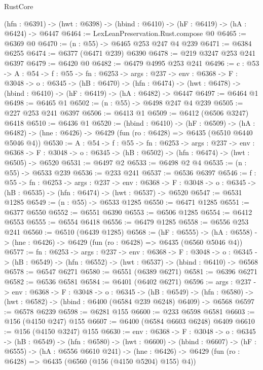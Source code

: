 \begin{lexlean}{RustCore}
\begin{coremodule}
  (hfn : @6391) -> (hwt : @6398) -> (hbind : @6410) -> (hF : @6419) -> (hA : @6424) -> @6447
@6464 := LexLeanPreservation.Rust.compose @0
@6465 := @6369 @0
@6470 := (n : @55) -> @6465 @253 @247 @4 @239
@6471 := @6384 @6255
@6474 := @6377 (@6471 @239) @6390
@6478 := @219 @3247 @253 @241 @6397
@6479 := @6420 @0
@6482 := @6479 @4995 @253 @241
@6496 := {c : @53} ->
  {A : @54} ->
  {f : @55} ->
  {fn : @6253} ->
  {args : @237} ->
  {env : @6368} ->
  {F : @3048} ->
  {o : @6345} ->
  (hB : @6470) ->
  (hfn : @6474) -> (hwt : @6478) -> (hbind : @6410) -> (hF : @6419) -> (hA : @6482) -> @6447
@6497 := @6464 @1
@6498 := @6465 @1
@6502 := (n : @55) -> @6498 @247 @4 @239
@6505 := @227 @253 @241 @6397
@6506 := @6413 @1
@6509 := @6412 (@6506 @3247) @6418
@6510 := @6436 @1
@6520 := (hbind : @6410) ->
  (hF : @6509) ->
  (hA : @6482) -> (hne : @6426) -> @6429 (fun (ro : @6428) => @6435 (@6510 @6440 @5046 @4))
@6530 := {A : @54} ->
  {f : @55} ->
  {fn : @6253} ->
  {args : @237} ->
  {env : @6368} ->
  {F : @3048} -> {o : @6345} -> (hB : @6502) -> (hfn : @6474) -> (hwt : @6505) -> @6520
@6531 := @6497 @2
@6533 := @6498 @2 @4
@6535 := (n : @55) -> @6533 @239
@6536 := @233 @241
@6537 := @6536 @6397
@6546 := {f : @55} ->
  {fn : @6253} ->
  {args : @237} ->
  {env : @6368} ->
  {F : @3048} -> {o : @6345} -> (hB : @6535) -> (hfn : @6474) -> (hwt : @6537) -> @6520
@6547 := @6531 @1285
@6549 := (n : @55) -> @6533 @1285
@6550 := @6471 @1285
@6551 := @6377 @6550
@6552 := @6551 @6390
@6553 := @6506 @1285
@6554 := @6412 @6553
@6555 := @6554 @6418
@6556 := @6479 @1285
@6558 := @6556 @253 @241
@6560 := @6510 (@6439 @1285)
@6568 := (hF : @6555) ->
  (hA : @6558) -> (hne : @6426) -> @6429 (fun (ro : @6428) => @6435 (@6560 @5046 @4))
@6577 := {fn : @6253} ->
  {args : @237} ->
  {env : @6368} ->
  {F : @3048} ->
  {o : @6345} -> (hB : @6549) -> (hfn : @6552) -> (hwt : @6537) -> (hbind : @6410) -> @6568
@6578 := @6547 @6271
@6580 := @6551 (@6389 @6271)
@6581 := @6396 @6271
@6582 := @6536 @6581
@6584 := @6401 (@6402 @6271)
@6596 := {args : @237} ->
  {env : @6368} ->
  {F : @3048} ->
  {o : @6345} ->
  (hB : @6549) ->
  (hfn : @6580) -> (hwt : @6582) -> (hbind : @6400 (@6584 @239 @6248) @6409) -> @6568
@6597 := @6578 @6239
@6598 := @6281 @155
@6600 := @233 @6598 @6581
@6603 := @156 (@4150 @247) @155
@6607 := @6400 (@6584 @6603 @6248) @6409
@6610 := @156 (@4150 @3247) @155
@6630 := {env : @6368} ->
  {F : @3048} ->
  {o : @6345} ->
  (hB : @6549) ->
  (hfn : @6580) ->
  (hwt : @6600) ->
  (hbind : @6607) ->
  (hF : @6555) ->
  (hA : @6556 @6610 @241) ->
  (hne : @6426) -> @6429 (fun (ro : @6428) => @6435 (@6560 (@156 (@4150 @5204) @155) @4))

\end{coremodule}
\end{lexlean}
